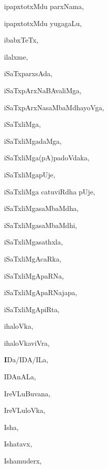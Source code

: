 \begin{multicols}{3}
{\noindent
{ipapxtotxMdu parxNama}, \pageref{ipapxtotxMdu parxNama}

\noindent
{ipapxtotxMdu yugagaLu}, \pageref{ipapxtotxMdu yugagaLu}

\noindent
{ibabxTeTx}, \pageref{ibabxTeTx}

\noindent
{ilalxme}, \pageref{ilalxme}

\noindent
{iSaTxparxsAda}, \pageref{iSaTxparxsAda}

\noindent
{iSaTxpArxNaBAvaliMga}, \pageref{iSaTxpArxNaBAvaliMga}

\noindent
{iSaTxpArxNasaMbaMdhayoVga}, \pageref{iSaTxpArxNasaMbaMdhayoVga}

\noindent
{iSaTxliMga}, \pageref{iSaTxliMga}

\noindent
{iSaTxliMgadaMga}, \pageref{iSaTxliMgadaMga}

\noindent
{iSaTxliMga(pA)padoVdaka}, \pageref{iSaTxliMga(pA)padoVdaka}

\noindent
{iSaTxliMgapUje}, \pageref{iSaTxliMgapUje}

\noindent
{iSaTxliMga catuviRdha pUje}, \pageref{iSaTxliMga catuviRdha pUje}

\noindent
{iSaTxliMgasaMbaMdha}, \pageref{iSaTxliMgasaMbaMdha}

\noindent
{iSaTxliMgasaMbaMdhi}, \pageref{iSaTxliMgasaMbaMdhi}

\noindent
{iSaTxliMgasathxla}, \pageref{iSaTxliMgasathxla}

\noindent
{iSaTxliMgAcaRka}, \pageref{iSaTxliMgAcaRka}

\noindent
{iSaTxliMgApaRNa}, \pageref{iSaTxliMgApaRNa}

\noindent
{iSaTxliMgApaRNajapa}, \pageref{iSaTxliMgApaRNajapa}

\noindent
{iSaTxliMgApiRta}, \pageref{iSaTxliMgApiRta}

\noindent
{ihaloVka}, \pageref{ihaloVka}

\noindent
{ihaloVkaviVra}, \pageref{ihaloVkaviVra}

\noindent
{{\large\textbf{I}}Da/IDA/ILa}, \pageref{IDa/IDA/ILa}

\noindent
{IDAnALa}, \pageref{IDAnALa}

\noindent
{IreVLuBuvana}, \pageref{IreVLuBuvana}

\noindent
{IreVLuloVka}, \pageref{IreVLuloVka}

\noindent
{Isha}, \pageref{Isha}

\noindent
{Ishatavx}, \pageref{Ishatavx}

\noindent
{Ishamuderx}, \pageref{Ishamuderx}

}
\end{multicols}
